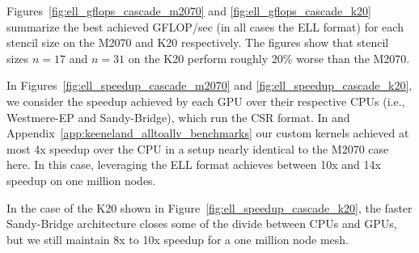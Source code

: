 \documentclass{report}
\begin{document}
Figures~\ref{fig:ell_gflops_cascade_m2070} and \ref{fig:ell_gflops_cascade_k20} summarize the best achieved GFLOP/sec (in all cases the ELL format) for each stencil size on the M2070 and K20 respectively. The figures show that stencil sizes $n=17$ and $n=31$ on the K20 perform roughly 20\% worse than the M2070. 

In Figures~\ref{fig:ell_speedup_cascade_m2070} and \ref{fig:ell_speedup_cascade_k20}, we consider the speedup achieved by each GPU over their respective CPUs  (i.e., Westmere-EP and Sandy-Bridge), which run the  CSR format. In \cite{BolligFlyerErlebacher2012} and Appendix~\ref{app:keeneland_alltoallv_benchmarks} our custom kernels achieved at most 4x speedup over the CPU in a setup nearly identical to the M2070 case here. In this case, leveraging the ELL format achieves between 10x and 14x speedup on one million nodes. 

In the case of the K20 shown in Figure~\ref{fig:ell_speedup_cascade_k20}, the faster Sandy-Bridge architecture closes some of the divide between CPUs and GPUs, but we still maintain 8x to 10x speedup for a one million node mesh.
\end{document}
